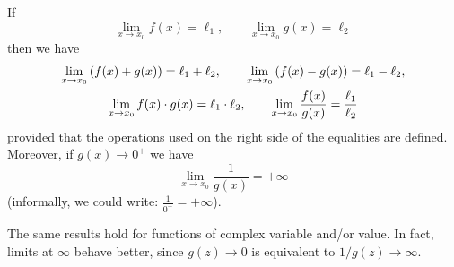 \begin{theorem}
  \label{th:operazioni_limiti}%
\mymark{***}%
If
\[
  \lim_{x\to x_0}f(x) = \ell_1,\qquad
  \lim_{x\to x_0}g(x) = \ell_2
\]
then we have
\begin{gather*}
  \lim_{x\to x_0} {\left( f(x) + g(x) \right)} = \ell_1 + \ell_2, \qquad
  \lim_{x\to x_0} {\left( f(x) - g(x) \right)} = \ell_1 - \ell_2, \\
  \lim_{x\to x_0} f(x)\cdot g(x) = \ell_1 \cdot \ell_2, \qquad
  \lim_{x\to x_0} \frac{f(x)}{g(x)} = \frac{\ell_1}{\ell_2}
\end{gather*}
provided that the operations used on the right side of the equalities
are defined.
Moreover, if $g(x)\to 0^+$ 
we have
\[
    \lim_{x\to x_0} \frac{1}{g(x)} = +\infty
\]
(informally, we could write: $\frac{1}{0^+} = +\infty$).

The same results hold for functions of complex variable and/or value.
In fact, limits at $\infty$ behave better, since 
$g(z)\to 0$ is equivalent to $1/g(z)\to \infty$.

\end{theorem}
%
